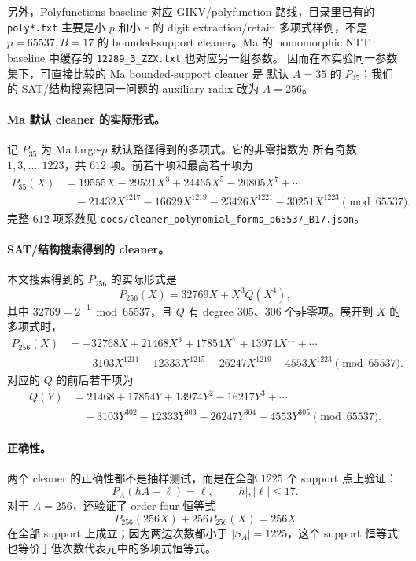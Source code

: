 另外，Polyfunctions baseline 对应 GIKV/polyfunction 路线，目录里已有的
\texttt{poly*.txt} 主要是小 \(p\) 和小 \(e\) 的 digit extraction/retain
多项式样例，不是 \(p=65537,B=17\) 的 bounded-support cleaner。Ma 的
homomorphic NTT baseline 中缓存的 \texttt{12289\_3\_ZZX.txt} 也对应另一组参数。
因而在本实验同一参数集下，可直接比较的 Ma bounded-support cleaner 是
默认 \(A=35\) 的 \(P_{35}\)；我们的 SAT/结构搜索把同一问题的 auxiliary
radix 改为 \(A=256\)。

\paragraph{Ma 默认 cleaner 的实际形式。}
记 \(P_{35}\) 为 Ma large-\(p\) 默认路径得到的多项式。它的非零指数为
所有奇数 \(1,3,\ldots,1223\)，共 \(612\) 项。前若干项和最高若干项为
\[
\begin{aligned}
P_{35}(X)
  &= 19555X -29521X^{3} +24465X^{5} -20805X^{7}+\cdots\\
  &\quad -21432X^{1217} -16629X^{1219} -23426X^{1221} -30251X^{1223} \pmod{65537}.
\end{aligned}
\]
完整 \(612\) 项系数见
\texttt{docs/cleaner\_polynomial\_forms\_p65537\_B17.json}。

\paragraph{SAT/结构搜索得到的 cleaner。}
本文搜索得到的 \(P_{256}\) 的实际形式是
\[
  P_{256}(X)=32769X+X^3Q(X^4),
\]
其中 \(32769=2^{-1}\bmod 65537\)，且 \(Q\) 有
degree \(305\)、\(306\) 个非零项。展开到 \(X\) 的多项式时，
\[
\begin{aligned}
P_{256}(X)
  &= -32768X +21468X^{3} +17854X^{7} +13974X^{11}+\cdots\\
  &\quad -3103X^{1211} -12333X^{1215} -26247X^{1219} -4553X^{1223} \pmod{65537}.
\end{aligned}
\]
对应的 \(Q\) 的前后若干项为
\[
\begin{aligned}
Q(Y)
  &= 21468 +17854Y +13974Y^{2} -16217Y^{3}+\cdots\\
  &\quad -3103Y^{302} -12333Y^{303} -26247Y^{304} -4553Y^{305} \pmod{65537}.
\end{aligned}
\]

\paragraph{正确性。}
两个 cleaner 的正确性都不是抽样测试，而是在全部 \(1225\) 个 support
点上验证：
\[
  P_A(hA+\ell)=\ell,\qquad |h|,|\ell|\le 17.
\]
对于 \(A=256\)，还验证了 order-four 恒等式
\[
  P_{256}(256X)+256P_{256}(X)=256X
\]
在全部 support 上成立；因为两边次数都小于 \(|S_A|=1225\)，这个 support
恒等式也等价于低次数代表元中的多项式恒等式。

